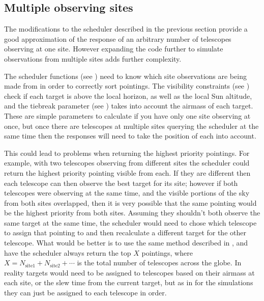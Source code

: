 \begin{colsection}
\begin{colsection}
\end{colsection}

\newpage
\subsection{Multiple observing sites}
\label{sec:multi_site_scheduling}
\begin{colsection}

The modifications to the scheduler described in the previous section provide a good approximation of the response of an arbitrary number of telescopes observing at one site. However expanding the code further to simulate observations from multiple sites adds further complexity.

The scheduler functions (see ) need to know which site observations are being made from in order to correctly sort pointings. The visibility constraints (see ) check if each target is above the local horizon, as well as the local Sun altitude, and the tiebreak parameter (see ) takes into account the airmass of each target. These are simple parameters to calculate if you have only one site observing at once, but once there are telescopes at multiple sites querying the scheduler at the same time then the responses will need to take the position of each into account.

This could lead to problems when returning the highest priority pointings. For example, with two telescopes observing from different sites the scheduler could return the highest priority pointing visible from each. If they are different then each telescope can then observe the best target for its site; however if both telescopes were observing at the same time, and the visible portions of the sky from both sites overlapped, then it is very possible that the same pointing would be the highest priority from both sites. Assuming they shouldn't both observe the same target at the same time, the scheduler would need to chose which telescope to assign that pointing to and then recalculate a different target for the other telescope. What would be better is to use the same method described in , and have the scheduler always return the top $X$ pointings, where $X = N_\text{site1} + N_\text{site2} + \cdots$ is the total number of telescopes across the globe. In reality targets would need to be assigned to telescopes based on their airmass at each site, or the slew time from the current target, but as in  for the simulations they can just be assigned to each telescope in order.


\end{colsection}
\end{colsection}
